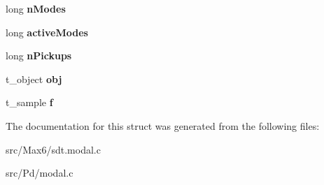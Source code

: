 \begin{DoxyCompactItemize}
\item 
\hypertarget{struct__modal_a0dc546eb719acbd60926018c4b4f0411}{}long {\bfseries n\+Modes}\label{struct__modal_a0dc546eb719acbd60926018c4b4f0411}

\item 
\hypertarget{struct__modal_aab42b16623d44e9ee740e2699500ba9d}{}long {\bfseries active\+Modes}\label{struct__modal_aab42b16623d44e9ee740e2699500ba9d}

\item 
\hypertarget{struct__modal_a96502f86a7598f65e328b7dae496f369}{}long {\bfseries n\+Pickups}\label{struct__modal_a96502f86a7598f65e328b7dae496f369}

\item 
\hypertarget{struct__modal_a21775ab6bc98b0961a6e9fd9d832e65b}{}t\+\_\+object {\bfseries obj}\label{struct__modal_a21775ab6bc98b0961a6e9fd9d832e65b}

\item 
\hypertarget{struct__modal_a3b27de018058e7941a2f36d7a28c2cda}{}t\+\_\+sample {\bfseries f}\label{struct__modal_a3b27de018058e7941a2f36d7a28c2cda}

\end{DoxyCompactItemize}


The documentation for this struct was generated from the following files\+:\begin{DoxyCompactItemize}
\item 
src/\+Max6/sdt.\+modal.\+c\item 
src/\+Pd/modal.\+c\end{DoxyCompactItemize}
